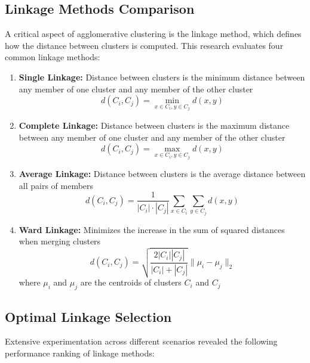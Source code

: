 \subsection{Linkage Methods Comparison}

A critical aspect of agglomerative clustering is the linkage method, which defines how the distance between clusters is computed. This research evaluates four common linkage methods:

\begin{enumerate}
    \item \textbf{Single Linkage:} Distance between clusters is the minimum distance between any member of one cluster and any member of the other cluster
    \begin{equation}
        d(C_i, C_j) = \min_{x \in C_i, y \in C_j} d(x, y)
    \end{equation}
    
    \item \textbf{Complete Linkage:} Distance between clusters is the maximum distance between any member of one cluster and any member of the other cluster
    \begin{equation}
        d(C_i, C_j) = \max_{x \in C_i, y \in C_j} d(x, y)
    \end{equation}
    
    \item \textbf{Average Linkage:} Distance between clusters is the average distance between all pairs of members
    \begin{equation}
        d(C_i, C_j) = \frac{1}{|C_i| \cdot |C_j|} \sum_{x \in C_i} \sum_{y \in C_j} d(x, y)
    \end{equation}
    
    \item \textbf{Ward Linkage:} Minimizes the increase in the sum of squared distances when merging clusters
    \begin{equation}
        d(C_i, C_j) = \sqrt{\frac{2 |C_i| |C_j|}{|C_i| + |C_j|}} \| \mu_i - \mu_j \|_2
    \end{equation}
    where $\mu_i$ and $\mu_j$ are the centroids of clusters $C_i$ and $C_j$
\end{enumerate}

\subsection{Optimal Linkage Selection}

Extensive experimentation across different scenarios revealed the following performance ranking of linkage methods:

